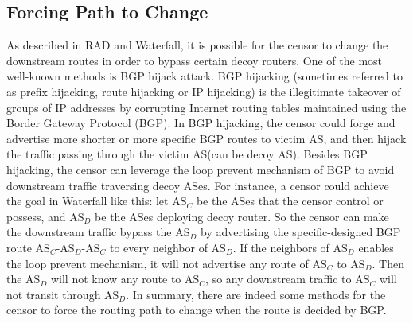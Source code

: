 \documentclass[conference]{IEEEtran}
\begin{document}
\subsection{Forcing Path to Change}
As described in RAD and Waterfall, it is possible for the censor to change the downstream routes in order to bypass certain decoy routers. One of the most well-known methods is BGP hijack attack. BGP hijacking (sometimes referred to as prefix hijacking, route hijacking or IP hijacking) is the illegitimate takeover of groups of IP addresses by corrupting Internet routing tables maintained using the Border Gateway Protocol (BGP). In BGP hijacking, the censor could forge and advertise more shorter or more specific BGP routes to victim AS, and then hijack the traffic passing through the victim AS(can be decoy AS). Besides BGP hijacking, the censor can leverage the loop prevent mechanism of BGP to avoid downstream traffic traversing decoy ASes. For instance, a censor could achieve the goal in Waterfall like this: let AS$_{C}$ be the ASes that the censor control or possess, and AS$_{D}$ be the ASes deploying decoy router. So the censor can make the downstream traffic bypass the AS$_{D}$ by advertising the specific-designed BGP route AS$_{C}$-AS$_{D}$-AS${_{C}}$ to every neighbor of AS$_{D}$. If the neighbors of AS$_{D}$ enables the loop prevent mechanism, it will not advertise any route of AS$_{C}$ to AS$_{D}$. Then the AS$_{D}$ will not know any route to AS$_{C}$, so any downstream traffic to AS$_{C}$ will not transit through AS$_{D}$. In summary, there are indeed some methods for the censor to force the routing path to change when the route is decided by BGP.
\end{document}
